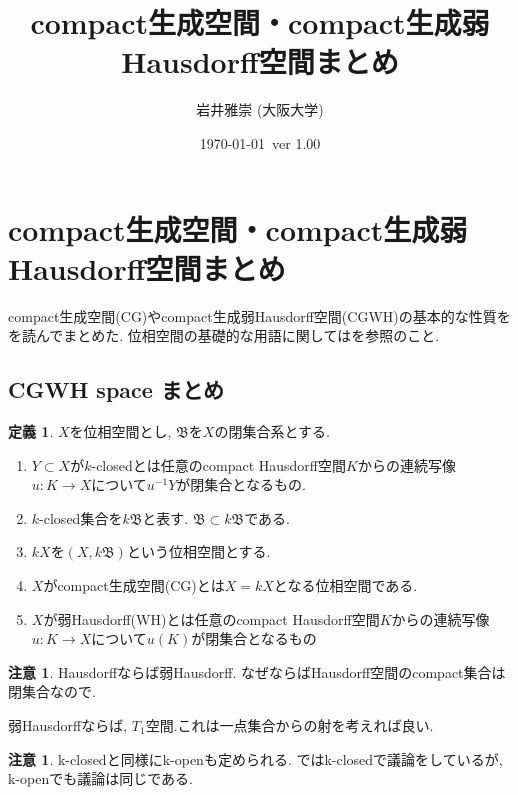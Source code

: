 \documentclass[dvipdfmx,a4paper,11pt]{article}
\title{compact生成空間・compact生成弱Hausdorff空間まとめ}
\author{岩井雅崇 (大阪大学)}
\date{\today \, ver 1.00}
\theoremstyle{definition}
\newtheorem{dfn}[thm]{定義}
\newtheorem{rem}[thm]{注意}
\begin{document}
\maketitle
\tableofcontents
\section{compact生成空間・compact生成弱Hausdorff空間まとめ}
compact生成空間(CG)やcompact生成弱Hausdorff空間(CGWH)の基本的な性質を\cite{Str}を読んでまとめた. 
位相空間の基礎的な用語に関しては\cite{Iwa22}を参照のこと.

\subsection{CGWH space まとめ}


 \begin{tcolorbox}
 [colback = white, colframe = green!35!black, fonttitle = \bfseries,breakable = true]
\begin{dfn}\cite[Definition 1.1 ,1.2]{Str}
$X$を位相空間とし, $\mathfrak{B}$を$X$の閉集合系とする. 
\begin{enumerate}
\item $Y \subset X$が$k$-closedとは任意のcompact Hausdorff空間$K$からの連続写像$u : K \to X$について$u^{-1}Y$が閉集合となるもの. 
\item $k$-closed集合を$k\mathfrak{B}$と表す. $\mathfrak{B} \subset k \mathfrak{B}$である.
\item $kX$を$(X, k\mathfrak{B})$という位相空間とする. 
\item $X$がcompact生成空間(CG)とは$X = kX$となる位相空間である.
\item $X$が弱Hausdorff(WH)とは任意のcompact Hausdorff空間$K$からの連続写像$u : K \to X$について$u(K)$が閉集合となるもの
\end{enumerate}
\end{dfn}
\end{tcolorbox}

\begin{rem}
Hausdorffならば弱Hausdorff.
なぜならばHausdorff空間のcompact集合は閉集合なので.

弱Hausdorffならば, $T_1$空間.これは一点集合からの射を考えれば良い.
\end{rem}

\begin{rem}
k-closedと同様にk-openも定められる. 
\cite{Str}ではk-closedで議論をしているが, k-openでも議論は同じである.
\end{rem}
\end{document}
